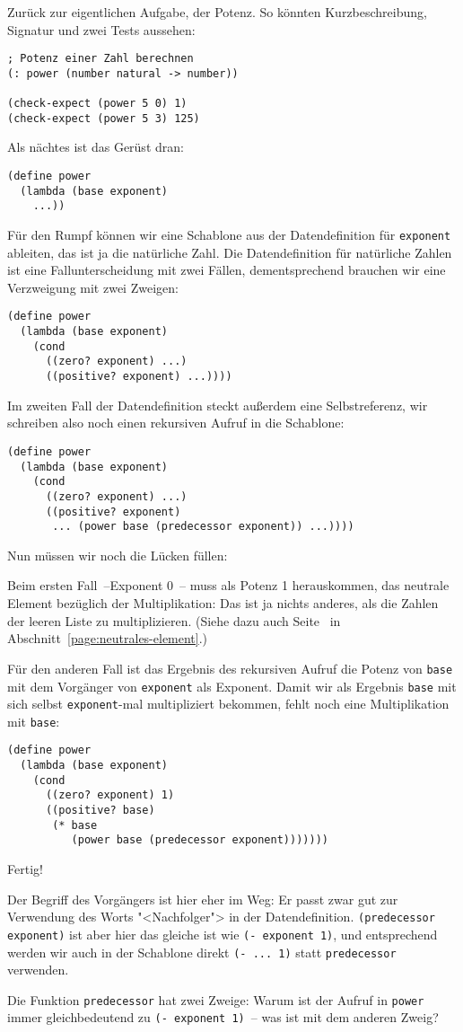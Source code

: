 Zurück zur eigentlichen Aufgabe, der Potenz.  So könnten
Kurzbeschreibung, Signatur und zwei Tests aussehen:
%
\begin{lstlisting}
; Potenz einer Zahl berechnen
(: power (number natural -> number))

(check-expect (power 5 0) 1)
(check-expect (power 5 3) 125)
\end{lstlisting}
%
Als nächtes ist das Gerüst dran:
%
\begin{lstlisting}
(define power
  (lambda (base exponent)
    ...))
\end{lstlisting}
%
Für den Rumpf können wir eine Schablone aus der Datendefinition
für \lstinline{exponent} ableiten, das ist ja die natürliche
Zahl.  Die Datendefinition für natürliche Zahlen ist eine
Fallunterscheidung mit zwei Fällen, dementsprechend brauchen wir eine
Verzweigung mit zwei Zweigen:
%
\begin{lstlisting}
(define power
  (lambda (base exponent)
    (cond
      ((zero? exponent) ...)
      ((positive? exponent) ...))))
\end{lstlisting}
%
Im zweiten Fall der Datendefinition steckt außerdem eine
Selbstreferenz, wir schreiben also noch einen rekursiven Aufruf in die
Schablone:
%
\begin{lstlisting}
(define power
  (lambda (base exponent)
    (cond
      ((zero? exponent) ...)
      ((positive? exponent)
       ... (power base (predecessor exponent)) ...))))
\end{lstlisting}
%
Nun müssen wir noch die Lücken füllen:

Beim ersten Fall~--Exponent 0~-- muss als Potenz 1 herauskommen, das
neutrale Element bezüglich der Multiplikation: Das ist ja nichts
anderes, als die Zahlen der leeren Liste zu multiplizieren.  (Siehe
dazu auch Seite~\pageref{page:neutrales-element} in
Abschnitt~\ref{page:neutrales-element}.)

Für den anderen Fall ist das Ergebnis des rekursiven Aufruf die Potenz
von \lstinline{base} mit dem Vorgänger von \lstinline{exponent} als
Exponent.  Damit wir als Ergebnis \lstinline{base} mit sich selbst
\lstinline{exponent}-mal multipliziert bekommen, fehlt noch eine
Multiplikation mit \lstinline{base}:
%
\begin{lstlisting}
(define power
  (lambda (base exponent)
    (cond
      ((zero? exponent) 1)
      ((positive? base)
       (* base
          (power base (predecessor exponent)))))))
\end{lstlisting}
%
Fertig!

Der Begriff des Vorgängers ist hier eher im Weg: Er passt zwar gut zur
Verwendung des Worts "<Nachfolger"> in der
Datendefinition. \lstinline{(predecessor exponent)} ist aber hier das
gleiche ist wie \lstinline{(- exponent 1)}, und entsprechend werden
wir auch in der Schablone direkt \lstinline{(- ... 1)} statt
\lstinline{predecessor} verwenden.
\begin{aufgabe}
  Die Funktion \lstinline{predecessor} hat zwei Zweige: Warum ist der
  Aufruf in \lstinline{power} immer gleichbedeutend zu
  \lstinline{(- exponent 1)}~-- was ist mit dem anderen Zweig?
\end{aufgabe}


